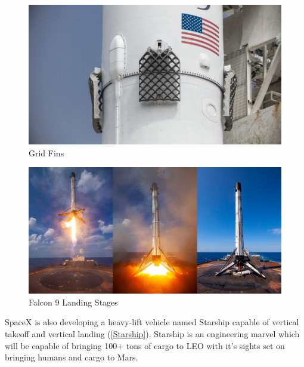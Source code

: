 \begin{figure}[H]
    \centering
    \includegraphics[scale=0.3]{src/figs/GridFins.jpg}
    \caption{Grid Fins}
    \label{fig:GFs}
\end{figure}

\begin{figure}[H]
    \centering
    \includegraphics[scale=0.4]{src/figs/Falcon9_Landed.jpg}
    \caption{Falcon 9 Landing Stages}
    \label{fig:Fal9}
\end{figure}

SpaceX is also developing a heavy-lift vehicle named Starship capable of vertical takeoff and vertical landing (\ref{Starship}). Starship is an engineering marvel which will be capable of bringing 100+ tons of cargo to LEO with it's sights set on bringing humans and cargo to Mars.


